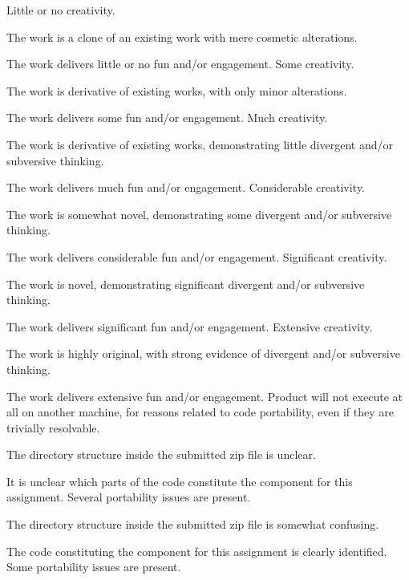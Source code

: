 \documentclass{../../fal_assignment}
\begin{document}
\begin{markingrubric}
%
        \grade\fail Little or no creativity.
            \par The work is a clone of an existing work with mere cosmetic alterations.
            \par The work delivers little or no fun and/or engagement.
        \grade Some creativity.
            \par The work is derivative of existing works, with only minor alterations.
            \par The work delivers some fun and/or engagement.
        \grade Much creativity.
            \par The work is derivative of existing works, demonstrating little divergent and/or subversive thinking.
            \par The work delivers much fun and/or engagement.
        \grade Considerable creativity.
            \par The work is somewhat novel, demonstrating some divergent and/or subversive thinking.
            \par The work delivers considerable fun and/or engagement.
        \grade Significant creativity.
            \par The work is novel, demonstrating significant divergent and/or subversive thinking.
            \par The work delivers significant fun and/or engagement.
        \grade Extensive creativity.
            \par The work is highly original, with strong evidence of divergent and/or subversive thinking.
            \par The work delivers extensive fun and/or engagement.
%
        \grade\fail Product will not execute at all on another machine, for reasons related to code portability, even if they are trivially resolvable.
            \par The directory structure inside the submitted zip file is unclear.
            \par It is unclear which parts of the code constitute the component for this assignment.
        \grade Several portability issues are present.
            \par The directory structure inside the submitted zip file is somewhat confusing.
            \par The code constituting the component for this assignment is clearly identified.
        \grade Some portability issues are present.

\end{markingrubric}
\end{document}
